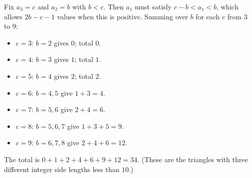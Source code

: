 Fix $a_3=c$ and $a_2=b$ with $b<c$. Then $a_1$ must satisfy $c-b<a_1<b$, which allows $2b-c-1$ values when this is positive. Summing over $b$ for each $c$ from $3$ to $9$:
\begin{itemize}
\item $c=3$: $b=2$ gives $0$; total $0$.
\item $c=4$: $b=3$ gives $1$; total $1$.
\item $c=5$: $b=4$ gives $2$; total $2$.
\item $c=6$: $b=4,5$ give $1+3=4$.
\item $c=7$: $b=5,6$ give $2+4=6$.
\item $c=8$: $b=5,6,7$ give $1+3+5=9$.
\item $c=9$: $b=6,7,8$ give $2+4+6=12$.
\end{itemize}
The total is $0+1+2+4+6+9+12=\boxed{34}$. (These are the triangles with three different integer side lengths less than $10$.)
